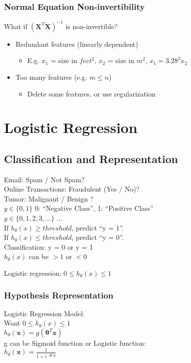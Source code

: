 \documentclass{article}
\newcommand{\vect}[1]{\boldsymbol{#1}}
\begin{document}
\subsubsection{Normal Equation Non-invertibility}
What if $(\vect{X}^T\vect{X})^{-1}$ is non-invertible?
\begin{itemize}
  \item Redundant features (linearly dependent)
  \begin{itemize}
    \item E.g. $x_1$ = size in $feet^2$, $x_2$ = size in $m^2$, $x_1 = 3.28^2 x_2$
  \end{itemize}
  \item Too many features (e.g. $m \le n$)
  \begin{itemize}
    \item Delete some features, or use regularization
  \end{itemize}
\end{itemize}

\section{Logistic Regression}
\subsection{Classification and Representation}
Email: Spam / Not Spam? \\
Online Transactions: Fraudulent (Yes / No)? \\
Tumor: Malignant / Benign ? \\

$y \in \{0, 1\}$ 0: ``Negative Class'', 1: ``Positive Class''\\
$y \in \{0, 1, 2, 3, ...\}$ ...\\

If $h_\theta(x) \ge threshold$, predict ``y = 1''. \\
If $h_\theta(x) \le threshold$, predict ``y = 0''. \\

Classification: y = 0 or y = 1\\
$h_\theta(x)$ can be $ > 1$ or $ < 0$

Logistic regression: $0 \le h_\theta(x) \le 1$ 

\subsubsection{Hypothesis Representation}
Logistic Regression Model: \\
Want $0 \le h_\theta(x) \le 1$ \\
$h_\theta(\vect{x}) = g(\vect{\theta}^T \vect{x})$ \\
g can be Sigmoid function or Logistic function: \\
$h_\theta(\vect{x}) = \frac{1}{1 + e^{-\vect{\theta}^T \vect{x}}}$ \\
\end{document}
